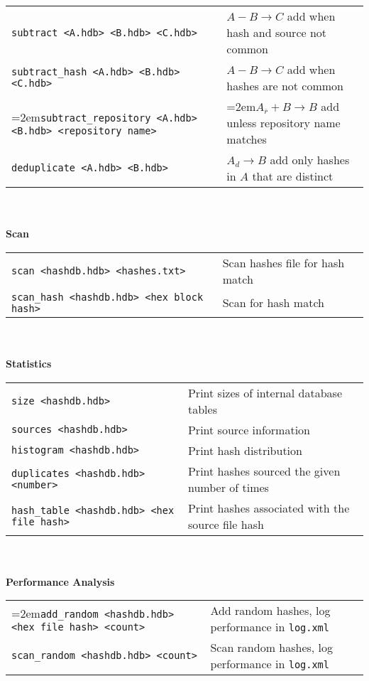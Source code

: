 \begin{footnotesize}
\begin{tabular}{p{3.6 in} p{3.0 in}}
\texttt{subtract <A.hdb> <B.hdb> <C.hdb>} & $A - B \rightarrow C$ add when hash and source not common\\
\texttt{subtract\_hash <A.hdb> <B.hdb> <C.hdb>} & $A - B \rightarrow C$ add when hashes are not common\\
\hangindent=2em\texttt{subtract\_repository <A.hdb> <B.hdb> <repository name>} & \hangindent=2em$A_{\overline{r}} + B \rightarrow B$ add unless repository name matches\\
\texttt{deduplicate <A.hdb> <B.hdb>} & $A_d \rightarrow B$ add only hashes in $A$ that are distinct\\
\end{tabular}
\\
\\
\textbf{Scan} \\
\begin{tabular}{p{3.6 in} p{3.0 in}}
\texttt{scan <hashdb.hdb> <hashes.txt>} & Scan hashes file for hash match \\
\texttt{scan\_hash <hashdb.hdb> <hex block hash>} & Scan for hash match \\
\end{tabular}
\\
\\
\textbf{Statistics}\\
\begin{tabular}{p{3.6 in} p{3.0 in}}
\texttt{size <hashdb.hdb>} & Print sizes of internal database tables \\
\texttt{sources <hashdb.hdb>} & Print source information \\
\texttt{histogram <hashdb.hdb>} & Print hash distribution \\
\texttt{duplicates <hashdb.hdb> <number>} & Print hashes sourced the given number of times \\
\texttt{hash\_table <hashdb.hdb> <hex file hash>} & Print hashes associated with the source file hash\\
\end{tabular}
\\
\\
\textbf{Performance Analysis}\\
\begin{tabular}{p{3.6 in} p{4 in}}
\hangindent=2em\texttt{add\_random <hashdb.hdb> <hex file hash> <count>} & Add random hashes, log performance in \texttt{log.xml}\\
\texttt{scan\_random <hashdb.hdb> <count>} & Scan random hashes, log performance in \texttt{log.xml}\\

\end{tabular}
\end{footnotesize}
